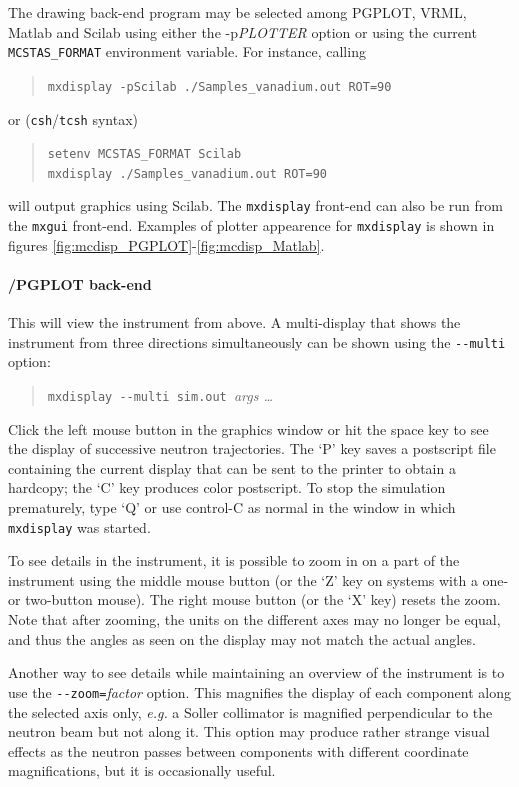    
The drawing back-end program may be selected among PGPLOT, VRML, Matlab and Scilab using either the -p{\it PLOTTER} option or using the current \verb+MCSTAS_FORMAT+ environment variable. 
For instance, calling
\begin{quote}
  \verb+mxdisplay -pScilab ./Samples_vanadium.out ROT=90+
\end{quote}
or (\verb+csh+/\verb+tcsh+ syntax)
\begin{quote}
  \verb+setenv MCSTAS_FORMAT Scilab+\\
  \verb+mxdisplay ./Samples_vanadium.out ROT=90+
\end{quote}
will output graphics using Scilab.
The \verb+mxdisplay+ front-end can also be run from the \verb+mxgui+ front-end.
Examples of plotter appearence for \verb+mxdisplay+ is shown in figures
 \ref{fig:mcdisp_PGPLOT}-\ref{fig:mcdisp_Matlab}.

\paragraph{\MCX /PGPLOT back-end}

This will view the instrument from above. A
multi-display that shows the instrument from three directions
simultaneously can be shown using the \verb+--multi+ option:
\begin{quote}
  \verb+mxdisplay --multi sim.out +{\it args \ldots}
\end{quote}

Click the left mouse button in the graphics window or hit the space key
to see the display of successive neutron trajectories. The `P' key saves
a postscript file containing the current display that can be sent to the
printer to obtain a hardcopy; the `C' key produces color postscript.
To stop the simulation
prematurely, type `Q' or use control-C as normal in the window in which
\verb+mxdisplay+ was started.

To see details in the instrument, it is possible to zoom in on a part of
the instrument using the middle mouse button (or the `Z' key on systems
with a one- or two-button mouse). The right mouse button (or the `X'
key) resets the zoom. Note that after zooming, the units on the
different axes may no longer be equal, and thus the angles as seen on
the display may not match the actual angles.

Another way to see details while maintaining an overview of the
instrument is to use the \verb+--zoom=+\textit{factor} option. This
magnifies the display of each component along the selected axis only,
{\em e.g.} a Soller collimator is magnified perpendicular to the neutron beam
but not along it. This option may produce rather strange visual effects
as the neutron passes between components with different coordinate
magnifications, but it is occasionally useful.

